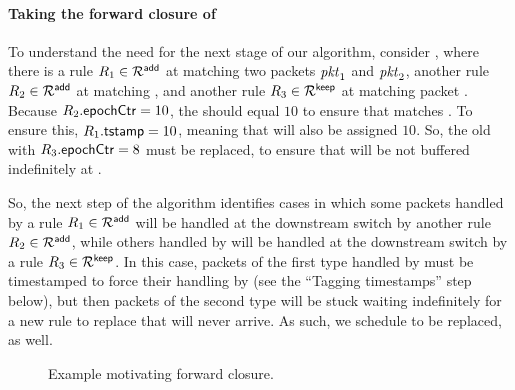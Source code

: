 \paragraph{Taking the forward closure of \addRules}



To understand the need for the next stage of our algorithm, consider
, where there is a rule $\ruleID{1} \in
\addRules$ at  matching two packets $\pktID{1}$ and
$\pktID{2}$, another rule $\ruleID{2} \in \addRules$ at 
matching , and another rule $\ruleID{3} \in \keepRules$ at
 matching packet . Because
$\ruleID{2}{\epochField} = 10$, the  should
equal $10$ to ensure that  matches .  To ensure
this, $\ruleID{1}{\tagTmpField} = 10$, meaning that
 will also be assigned $10$.  So, the old
 with $\ruleID{3}{\epochField} = 8$ must be replaced, to
ensure that  will be not buffered indefinitely at
.

So, the next step of the algorithm identifies cases in which some
packets handled by a rule $\ruleID{1} \in \addRules$ will be handled
at the downstream switch by another rule $\ruleID{2} \in \addRules$,
while others handled by  will be handled at the downstream
switch by a rule $\ruleID{3} \in \keepRules$.  In this case, packets
of the first type handled by  must be timestamped to force
their handling by  (see the ``Tagging timestamps'' step
below), but then packets of the second type will be stuck waiting
indefinitely for a new rule to replace  that will never
arrive.  As such, we schedule  to be replaced, as well.


\begin{figure}
\centering
\resizebox{0.75\linewidth}{!}{\small}
\caption{Example motivating forward closure.}
\label{fig:forward example}
\end{figure}


\medskip

